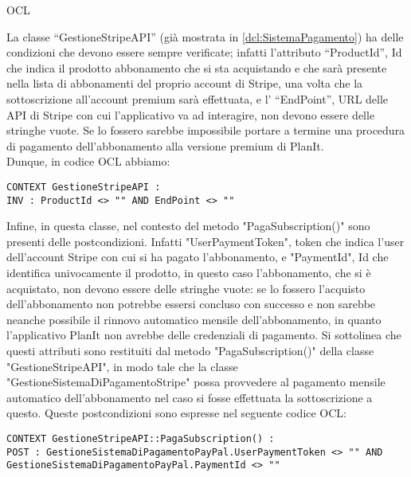 \begin{listaPersonale}{OCL}
    \begin{center}
        
    \end{center}
    La classe “GestioneStripeAPI” (già mostrata in \ref{dcl:SistemaPagamento}) ha delle condizioni che devono essere sempre verificate; infatti l'attributo “ProductId”, Id che indica il prodotto abbonamento che si sta acquistando e che sarà presente nella lista di abbonamenti del proprio account di Stripe, una volta che la sottoscrizione all'account premium sarà effettuata, e l' “EndPoint”, URL delle API di Stripe con cui l'applicativo va ad interagire, non devono essere delle stringhe vuote. Se lo fossero sarebbe impossibile portare a termine una procedura di pagamento dell'abbonamento alla versione premium di PlanIt. \\
    Dunque, in codice OCL abbiamo:
    \begin{lstlisting}
CONTEXT GestioneStripeAPI :
INV : ProductId <> "" AND EndPoint <> ""
    \end{lstlisting}
    Infine, in questa classe, nel contesto del metodo "PagaSubscription()" sono presenti delle postcondizioni. Infatti "UserPaymentToken", token che indica l'user dell'account Stripe con cui si ha pagato l'abbonamento, e "PaymentId", Id che identifica univocamente il prodotto, in questo caso l'abbonamento, che si è acquistato, non devono essere delle stringhe vuote: se lo fossero l'acquisto dell'abbonamento non potrebbe essersi concluso con successo e non sarebbe neanche possibile il rinnovo automatico mensile dell'abbonamento, in quanto l'applicativo PlanIt non avrebbe delle credenziali di pagamento. Si sottolinea che questi attributi sono restituiti dal metodo "PagaSubscription()" della classe "GestioneStripeAPI", in modo tale che la classe "GestioneSistemaDiPagamentoStripe" possa provvedere al pagamento mensile automatico dell'abbonamento nel caso si fosse effettuata la sottoscrizione a questo.
    Queste postcondizioni sono espresse nel seguente codice OCL:
    \begin{lstlisting}
CONTEXT GestioneStripeAPI::PagaSubscription() :
POST : GestioneSistemaDiPagamentoPayPal.UserPaymentToken <> "" AND GestioneSistemaDiPagamentoPayPal.PaymentId <> ""
    \end{lstlisting}





\end{listaPersonale}
